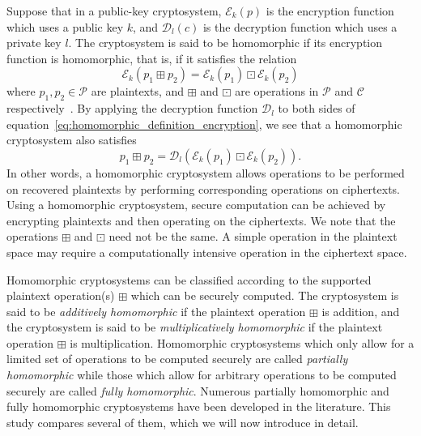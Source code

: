 Suppose that in a public-key cryptosystem, $\mathcal{E}_k \left(p \right)$ is the encryption function which uses a public key $k$, and $\mathcal{D}_l \left(c \right)$ is the decryption function which uses a private key $l$. The cryptosystem is said to be homomorphic if its encryption function is homomorphic, that is, if it satisfies the relation
\begin{equation}
    \label{eq:homomorphic_definition_encryption}
    \mathcal{E}_k \left(p_1 \boxplus p_2\right) = \mathcal{E}_k \left(p_1\right) \boxdot \mathcal{E}_k \left(p_2\right)
\end{equation}
where $p_1, p_2 \in \mathcal{P}$ are plaintexts, and $\boxplus$ and $\boxdot$ are operations in $\mathcal{P}$ and $\mathcal{C}$ respectively~\cite{fontaine_survey_2007}. By applying the decryption function $\mathcal{D}_l$ to both sides of equation~\ref{eq:homomorphic_definition_encryption}, we see that a homomorphic cryptosystem also satisfies~\cite{li_elliptic_2012}
\begin{equation}
    \label{eq:homomorphic_definition_decryption}
    p_1 \boxplus p_2 = \mathcal{D}_l \left( \mathcal{E}_k \left(p_1\right) \boxdot \mathcal{E}_k \left(p_2\right) \right).
\end{equation}
In other words, a homomorphic cryptosystem allows operations to be performed on recovered plaintexts by performing corresponding operations on ciphertexts. Using a homomorphic cryptosystem, secure computation can be achieved by encrypting plaintexts and then operating on the ciphertexts. We note that the operations $\boxplus$ and $\boxdot$ need not be the same. A simple operation in the plaintext space may require a computationally intensive operation in the ciphertext space.

Homomorphic cryptosystems can be classified according to the supported plaintext operation(s) $\boxplus$ which can be securely computed. The cryptosystem is said to be \textit{additively homomorphic} if the plaintext operation $\boxplus$ is addition, and the cryptosystem is said to be \textit{multiplicatively homomorphic} if the plaintext operation $\boxplus$ is multiplication. Homomorphic cryptosystems which only allow for a limited set of operations to be computed securely are called \textit{partially homomorphic} while those which allow for arbitrary operations to be computed securely are called \textit{fully homomorphic}. Numerous partially homomorphic and fully homomorphic cryptosystems have been developed in the literature. This study compares several of them, which we will now introduce in detail. 


